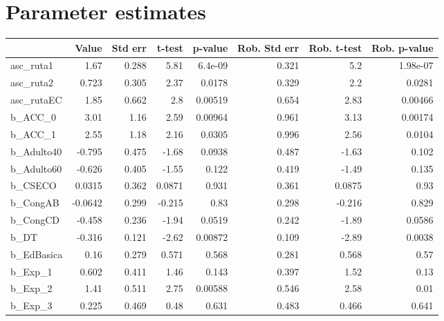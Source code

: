 \section{Parameter estimates}
\begin{tabular}{lrrrrrrr}
\toprule
{} &   Value &  Std err &    t-test &  p-value &  Rob. Std err &  Rob. t-test &  Rob. p-value \\
\midrule
asc\_ruta1     &    1.67 &    0.288 &      5.81 &  6.4e-09 &         0.321 &          5.2 &      1.98e-07 \\
asc\_ruta2     &   0.723 &    0.305 &      2.37 &   0.0178 &         0.329 &          2.2 &        0.0281 \\
asc\_rutaEC    &    1.85 &    0.662 &       2.8 &  0.00519 &         0.654 &         2.83 &       0.00466 \\
b\_ACC\_0       &    3.01 &     1.16 &      2.59 &  0.00964 &         0.961 &         3.13 &       0.00174 \\
b\_ACC\_1       &    2.55 &     1.18 &      2.16 &   0.0305 &         0.996 &         2.56 &        0.0104 \\
b\_Adulto40    &  -0.795 &    0.475 &     -1.68 &   0.0938 &         0.487 &        -1.63 &         0.102 \\
b\_Adulto60    &  -0.626 &    0.405 &     -1.55 &    0.122 &         0.419 &        -1.49 &         0.135 \\
b\_CSECO       &  0.0315 &    0.362 &    0.0871 &    0.931 &         0.361 &       0.0875 &          0.93 \\
b\_CongAB      & -0.0642 &    0.299 &    -0.215 &     0.83 &         0.298 &       -0.216 &         0.829 \\
b\_CongCD      &  -0.458 &    0.236 &     -1.94 &   0.0519 &         0.242 &        -1.89 &        0.0586 \\
b\_DT          &  -0.316 &    0.121 &     -2.62 &  0.00872 &         0.109 &        -2.89 &        0.0038 \\
b\_EdBasica    &    0.16 &    0.279 &     0.571 &    0.568 &         0.281 &        0.568 &          0.57 \\
b\_Exp\_1       &   0.602 &    0.411 &      1.46 &    0.143 &         0.397 &         1.52 &          0.13 \\
b\_Exp\_2       &    1.41 &    0.511 &      2.75 &  0.00588 &         0.546 &         2.58 &          0.01 \\
b\_Exp\_3       &   0.225 &    0.469 &      0.48 &    0.631 &         0.483 &        0.466 &         0.641 \\

\end{tabular}
